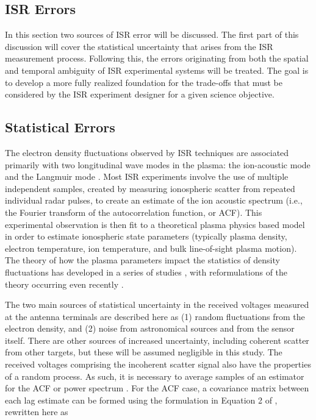 \documentclass[draft,ras]{agutex}
\begin{document}
\begin{article}
\section{ISR Errors}

In this section two sources of ISR error will be discussed. The first part of this discussion will cover the statistical uncertainty that arises from the ISR measurement process. Following this, the errors originating from both the spatial and temporal ambiguity of ISR experimental systems will be treated. The goal is to develop a more fully realized foundation for the trade-offs that must be considered by the ISR experiment designer for a given science objective.

\subsection{Statistical Errors}

The electron density fluctuations observed by ISR techniques are associated primarily with two longitudinal wave modes in the plasma: the ion-acoustic mode and the Langmuir mode \citep{evans;isr}.  Most ISR experiments involve the use of multiple independent samples, created by measuring ionospheric scatter from repeated individual radar pulses, to create an estimate of the ion acoustic spectrum (i.e., the Fourier transform of the autocorrelation function, or ACF). This experimental observation is then fit to a theoretical plasma physics based model in order to estimate ionospheric state parameters (typically plasma density, electron temperature, ion temperature, and bulk line-of-sight plasma motion). The theory of how the plasma parameters impact the statistics of density fluctuations has developed in a series of studies \citep{gordon58,dougherty:farley1960, farleydougherty:ISR2, doughteryfarley:ISR3, hagfors1961}, with reformulations of the theory occurring even recently  \citep{kudeki:milla:1,kudeki:milla:2}. 

The two main sources of statistical uncertainty in the received voltages measured at the antenna terminals are described here as (1) random fluctuations from the electron density, and (2) noise from astronomical sources and from  the sensor itself. There are other sources of increased uncertainty, including coherent scatter from other targets, but these will be assumed negligible in this study.  The received voltages comprising the incoherent scatter signal also have the properties of a random process. As such, it is necessary to average samples of an estimator for the ACF or power spectrum \citep{Diaz:2008co}.  For the ACF case, a covariance matrix between each lag estimate can be formed using the formulation in Equation 2 of \citet{hysell2008}, rewritten here as


\end{article}
\end{document}
